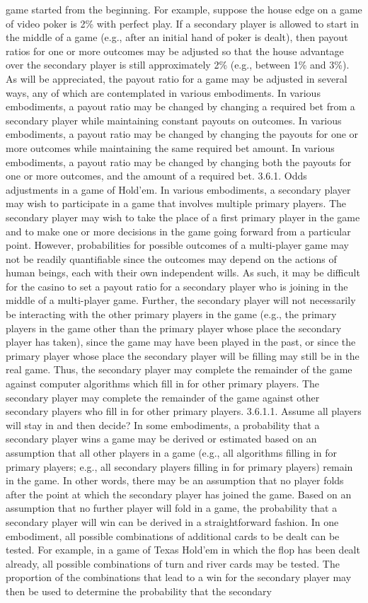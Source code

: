 \documentclass[11pt,a4paper]{article}
\begin{document}
game started from the beginning. For example, suppose the house edge on a game of video poker is 2\% with perfect play. If a secondary player is allowed to start in the middle of a game (e.g., after an initial hand of poker is dealt), then payout ratios for one or more outcomes may be adjusted so that the house advantage over the secondary player is still approximately 2\% (e.g., between 1\% and 3\%). As will be appreciated, the payout ratio for a game may be adjusted in several ways, any of which are contemplated in various embodiments. In various embodiments, a payout ratio may be changed by changing a required bet from a secondary player while maintaining constant payouts on outcomes. In various embodiments, a payout ratio may be changed by changing the payouts for one or more outcomes while maintaining the same required bet amount. In various embodiments, a payout ratio may be changed by changing both the payouts for one or more outcomes, and the amount of a required bet. 3.6.1. Odds adjustments in a game of Hold'em. In various embodiments, a secondary player may wish to participate in a game that involves multiple primary players. The secondary player may wish to take the place of a first primary player in the game and to make one or more decisions in the game going forward from a particular point. However, probabilities for possible outcomes of a multi-player game may not be readily quantifiable since the outcomes may depend on the actions of human beings, each with their own independent wills. As such, it may be difficult for the casino to set a payout ratio for a secondary player who is joining in the middle of a multi-player game. Further, the secondary player will not necessarily be interacting with the other primary players in the game (e.g., the primary players in the game other than the primary player whose place the secondary player has taken), since the game may have been played in the past, or since the primary player whose place the secondary player will be filling may still be in the real game. Thus, the secondary player may complete the remainder of the game against computer algorithms which fill in for other primary players. The secondary player may complete the remainder of the game against other secondary players who fill in for other primary players. 3.6.1.1. Assume all players will stay in and then decide? In some embodiments, a probability that a secondary player wins a game may be derived or estimated based on an assumption that all other players in a game (e.g., all algorithms filling in for primary players; e.g., all secondary players filling in for primary players) remain in the game. In other words, there may be an assumption that no player folds after the point at which the secondary player has joined the game. Based on an assumption that no further player will fold in a game, the probability that a secondary player will win can be derived in a straightforward fashion. In one embodiment, all possible combinations of additional cards to be dealt can be tested. For example, in a game of Texas Hold'em in which the flop has been dealt already, all possible combinations of turn and river cards may be tested. The proportion of the combinations that lead to a win for the secondary player may then be used to determine the probability that the secondary 
\end{document}
